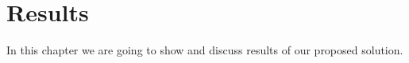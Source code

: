 \chapter{Results}

\label{kap:Results} %

In this chapter we are going to show and discuss results of our proposed solution.
